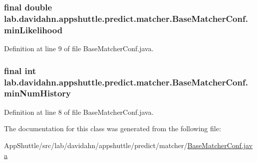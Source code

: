 \hypertarget{classlab_1_1davidahn_1_1appshuttle_1_1predict_1_1matcher_1_1_base_matcher_conf_aaa44f0af05066d7fde822700d845be29}{
\subsubsection[{min\-Likelihood}]{\setlength{\rightskip}{0pt plus 5cm}final double {\bf lab.\-davidahn.\-appshuttle.\-predict.\-matcher.\-Base\-Matcher\-Conf.\-min\-Likelihood}}}\label{classlab_1_1davidahn_1_1appshuttle_1_1predict_1_1matcher_1_1_base_matcher_conf_aaa44f0af05066d7fde822700d845be29}


\-Definition at line 9 of file \-Base\-Matcher\-Conf.\-java.

\hypertarget{classlab_1_1davidahn_1_1appshuttle_1_1predict_1_1matcher_1_1_base_matcher_conf_a5249864474dc7b468f2840354ee31689}{
\subsubsection[{min\-Num\-History}]{\setlength{\rightskip}{0pt plus 5cm}final int {\bf lab.\-davidahn.\-appshuttle.\-predict.\-matcher.\-Base\-Matcher\-Conf.\-min\-Num\-History}}}\label{classlab_1_1davidahn_1_1appshuttle_1_1predict_1_1matcher_1_1_base_matcher_conf_a5249864474dc7b468f2840354ee31689}


\-Definition at line 8 of file \-Base\-Matcher\-Conf.\-java.



\-The documentation for this class was generated from the following file\-:\begin{DoxyCompactItemize}
\item 
\-App\-Shuttle/src/lab/davidahn/appshuttle/predict/matcher/\hyperlink{_base_matcher_conf_8java}{\-Base\-Matcher\-Conf.\-java}\end{DoxyCompactItemize}
